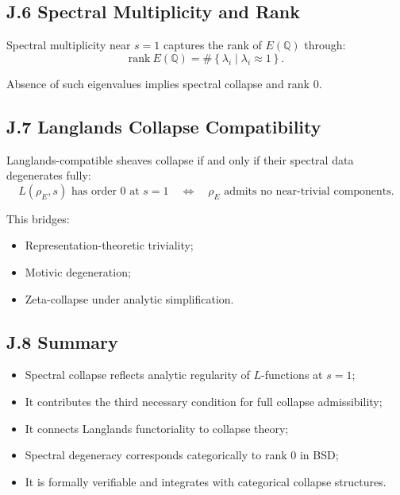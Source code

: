 \documentclass[11pt]{article}
\begin{document}
\subsection*{J.6 Spectral Multiplicity and Rank}

Spectral multiplicity near \( s = 1 \) captures the rank of \( E(\mathbb{Q}) \) through:
\[
\mathrm{rank}~E(\mathbb{Q}) = \# \left\{ \lambda_i \mid \lambda_i \approx 1 \right\}.
\]

Absence of such eigenvalues implies spectral collapse and rank 0.

\subsection*{J.7 Langlands Collapse Compatibility}

Langlands-compatible sheaves collapse if and only if their spectral data degenerates fully:
\[
L(\rho_E, s) \text{ has order 0 at } s = 1 \quad \Leftrightarrow \quad \rho_E \text{ admits no near-trivial components}.
\]

This bridges:
\begin{itemize}
  \item Representation-theoretic triviality;
  \item Motivic degeneration;
  \item Zeta-collapse under analytic simplification.
\end{itemize}

\subsection*{J.8 Summary}

\begin{itemize}
  \item Spectral collapse reflects analytic regularity of \( L \)-functions at \( s = 1 \);
  \item It contributes the third necessary condition for full collapse admissibility;
  \item It connects Langlands functoriality to collapse theory;
  \item Spectral degeneracy corresponds categorically to rank 0 in BSD;
  \item It is formally verifiable and integrates with categorical collapse structures.
\end{itemize}



\appendix
\end{document}
